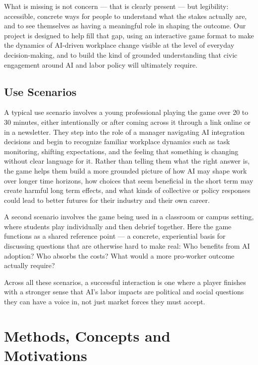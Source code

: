 \documentclass[sigconf,authordraft]{acmart}
\begin{document}
What is missing is not concern — that is clearly present — but legibility: accessible, concrete ways for people to understand what the stakes actually are, and to see themselves as having a meaningful role in shaping the outcome. Our project is designed to help fill that gap, using an interactive game format to make the dynamics of AI-driven workplace change visible at the level of everyday decision-making, and to build the kind of grounded understanding that civic engagement around AI and labor policy will ultimately require.


\subsection{Use Scenarios}

A typical use scenario involves a young professional playing the game over 20 to 30 minutes, either intentionally or after coming across it through a link online or in a newsletter. They step into the role of a manager navigating AI integration decisions and begin to recognize familiar workplace dynamics such as task monitoring, shifting expectations, and the feeling that something is changing without clear language for it. Rather than telling them what the right answer is, the game helps them build a more grounded picture of how AI may shape work over longer time horizons, how choices that seem beneficial in the short term may create harmful long term effects, and what kinds of collective or policy responses could lead to better futures for their industry and their own career.

A second scenario involves the game being used in a classroom or campus setting, where students play individually and then debrief together. Here the game functions as a shared reference point — a concrete, experiential basis for discussing questions that are otherwise hard to make real: Who benefits from AI adoption? Who absorbs the costs? What would a more pro-worker outcome actually require?

Across all these scenarios, a successful interaction is one where a player finishes with a stronger sense that AI's labor impacts are political and social questions they can have a voice in, not just market forces they must accept.


\section{Methods, Concepts and Motivations}
\end{document}
